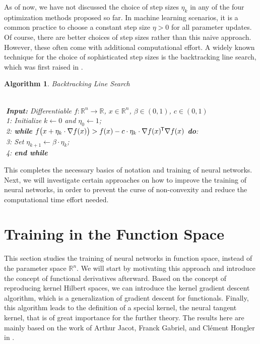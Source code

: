 \documentclass[11pt, a4paper]{article}
\newtheorem{algorithm}[theorem]{Algorithm}
\newcommand{\R}{\mathbb{R}}
\newcommand*{\tr}{^{\mkern-1.5mu\mathsf{T}}}
\begin{document}
As of now, we have not discussed the choice of step sizes $\eta_k$ in any of the four optimization methods proposed so far. In machine learning scenarios, it is a common practice to choose a constant step size $\eta > 0$ for all parameter updates. Of course, there are better choices of step sizes rather than this naive approach. However, these often come with additional computational effort. A widely known technique for the choice of sophisticated step sizes is the backtracking line search, which was first raised in \cite{Armijo}. 
\begin{algorithm} 
\caption{Backtracking Line Search \textcolor{white}{$\Big |$}} \ \\
\textcolor{white}{$\Big |$}\textbf{Input:} Differentiable $f: \R^n \to \R$, $x \in \R^n$, $\beta \in (0,1)$, $c \in (0,1)$ \\ 
\textcolor{white}{$\Big |$}1: Initialize $k \leftarrow 0$ and $\eta_0 \leftarrow 1$; \\
\textcolor{white}{$\Big |$}2: \textbf{while} $f \big (x + \eta_k \cdot \nabla f(x) \big) > f(x) - c \cdot \eta_k \cdot \nabla f(x) \tr \nabla f(x)$ \textbf{do}: \\
\textcolor{white}{$\Big |$}3: \quad Set $\eta_{k+1} \leftarrow \beta \cdot \eta_k$; \\
\textcolor{white}{$\Big |$}4: \textbf{end while}
\end{algorithm}

This completes the necessary basics of notation and training of neural networks. Next, we will investigate certain approaches on how to improve the training of neural networks, in order to prevent the curse of non-convexity and reduce the computational  time effort needed. \\

\pagebreak
\section{Training in the Function Space} \label{sec:functionspace}

This section studies the training of neural networks in function space, instead of the parameter space $\R^n$. We will start by motivating this approach and introduce the concept of functional derivatives afterward. Based on the concept of reproducing kernel Hilbert spaces, we can introduce the kernel gradient descent algorithm, which is a generalization of gradient descent for functionals. Finally, this algorithm leads to the definition of a special kernel, the neural tangent kernel, that is of great importance for the further theory. The results here are mainly based on the work of Arthur Jacot, Franck Gabriel, and Cl\'{e}ment Hongler in \cite{NTK}.
\end{document}
